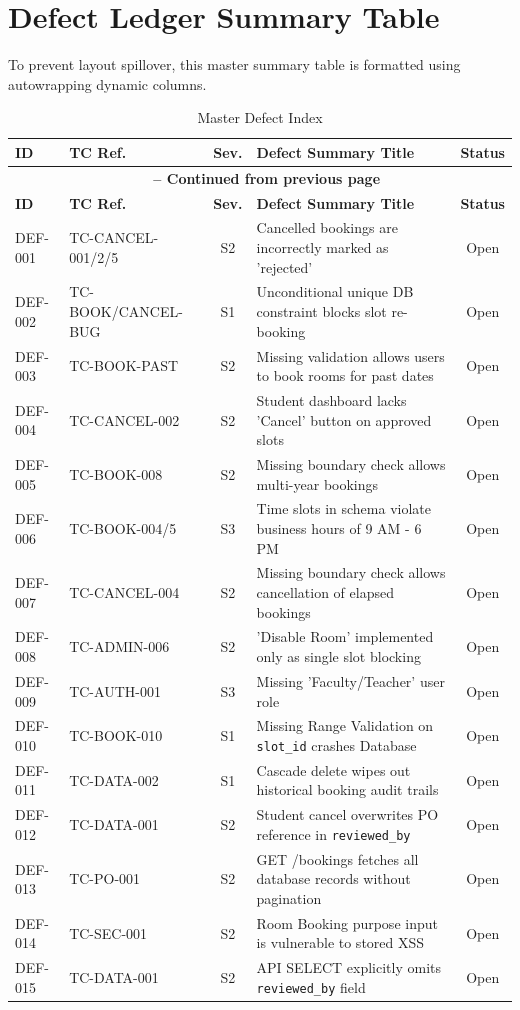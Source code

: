 \documentclass[11pt,a4paper]{article}
\begin{document}
\newpage
\section{Defect Ledger Summary Table}
To prevent layout spillover, this master summary table is formatted using autowrapping dynamic columns.

\begin{center}
\begin{longtable}{@{}llcp{6.5cm}c@{}}
\caption{Master Defect Index} \label{tab:defect_index} \\
\toprule
\textbf{ID} & \textbf{TC Ref.} & \textbf{Sev.} & \textbf{Defect Summary Title} & \textbf{Status} \\ \midrule
\endfirsthead
\multicolumn{5}{c}{{\bfseries \tablename\ \thetable{} -- Continued from previous page}} \\
\toprule
\textbf{ID} & \textbf{TC Ref.} & \textbf{Sev.} & \textbf{Defect Summary Title} & \textbf{Status} \\ \midrule
\endhead
\bottomrule
\endfoot
\bottomrule
\endlastfoot

DEF-001 & TC-CANCEL-001/2/5 & S2 & Cancelled bookings are incorrectly marked as 'rejected' & Open \\
DEF-002 & TC-BOOK/CANCEL-BUG & S1 & Unconditional unique DB constraint blocks slot re-booking & Open \\
DEF-003 & TC-BOOK-PAST & S2 & Missing validation allows users to book rooms for past dates & Open \\
DEF-004 & TC-CANCEL-002 & S2 & Student dashboard lacks 'Cancel' button on approved slots & Open \\
DEF-005 & TC-BOOK-008 & S2 & Missing boundary check allows multi-year bookings & Open \\
DEF-006 & TC-BOOK-004/5 & S3 & Time slots in schema violate business hours of 9 AM - 6 PM & Open \\
DEF-007 & TC-CANCEL-004 & S2 & Missing boundary check allows cancellation of elapsed bookings & Open \\
DEF-008 & TC-ADMIN-006 & S2 & 'Disable Room' implemented only as single slot blocking & Open \\
DEF-009 & TC-AUTH-001 & S3 & Missing 'Faculty/Teacher' user role & Open \\
DEF-010 & TC-BOOK-010 & S1 & Missing Range Validation on \texttt{slot\_id} crashes Database & Open \\
DEF-011 & TC-DATA-002 & S1 & Cascade delete wipes out historical booking audit trails & Open \\
DEF-012 & TC-DATA-001 & S2 & Student cancel overwrites PO reference in \texttt{reviewed\_by} & Open \\
DEF-013 & TC-PO-001 & S2 & GET /bookings fetches all database records without pagination & Open \\
DEF-014 & TC-SEC-001 & S2 & Room Booking purpose input is vulnerable to stored XSS & Open \\
DEF-015 & TC-DATA-001 & S2 & API SELECT explicitly omits \texttt{reviewed\_by} field & Open \\
\end{longtable}
\end{center}
\end{document}
